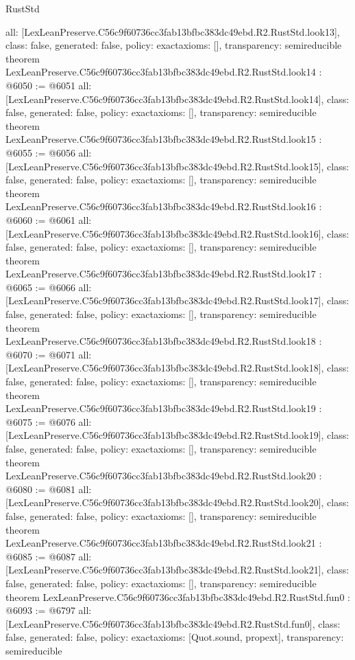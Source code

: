 \begin{lexlean}{RustStd}
\begin{coremodule}
{  all: [LexLeanPreserve.C56c9f60736cc3fab13bfbc383dc49ebd.R2.RustStd.look13],
  class: false,
  generated: false,
  policy: exact{axioms: []},
  transparency: semireducible
}
theorem LexLeanPreserve.C56c9f60736cc3fab13bfbc383dc49ebd.R2.RustStd.look14 : @6050 := @6051 {
  all: [LexLeanPreserve.C56c9f60736cc3fab13bfbc383dc49ebd.R2.RustStd.look14],
  class: false,
  generated: false,
  policy: exact{axioms: []},
  transparency: semireducible
}
theorem LexLeanPreserve.C56c9f60736cc3fab13bfbc383dc49ebd.R2.RustStd.look15 : @6055 := @6056 {
  all: [LexLeanPreserve.C56c9f60736cc3fab13bfbc383dc49ebd.R2.RustStd.look15],
  class: false,
  generated: false,
  policy: exact{axioms: []},
  transparency: semireducible
}
theorem LexLeanPreserve.C56c9f60736cc3fab13bfbc383dc49ebd.R2.RustStd.look16 : @6060 := @6061 {
  all: [LexLeanPreserve.C56c9f60736cc3fab13bfbc383dc49ebd.R2.RustStd.look16],
  class: false,
  generated: false,
  policy: exact{axioms: []},
  transparency: semireducible
}
theorem LexLeanPreserve.C56c9f60736cc3fab13bfbc383dc49ebd.R2.RustStd.look17 : @6065 := @6066 {
  all: [LexLeanPreserve.C56c9f60736cc3fab13bfbc383dc49ebd.R2.RustStd.look17],
  class: false,
  generated: false,
  policy: exact{axioms: []},
  transparency: semireducible
}
theorem LexLeanPreserve.C56c9f60736cc3fab13bfbc383dc49ebd.R2.RustStd.look18 : @6070 := @6071 {
  all: [LexLeanPreserve.C56c9f60736cc3fab13bfbc383dc49ebd.R2.RustStd.look18],
  class: false,
  generated: false,
  policy: exact{axioms: []},
  transparency: semireducible
}
theorem LexLeanPreserve.C56c9f60736cc3fab13bfbc383dc49ebd.R2.RustStd.look19 : @6075 := @6076 {
  all: [LexLeanPreserve.C56c9f60736cc3fab13bfbc383dc49ebd.R2.RustStd.look19],
  class: false,
  generated: false,
  policy: exact{axioms: []},
  transparency: semireducible
}
theorem LexLeanPreserve.C56c9f60736cc3fab13bfbc383dc49ebd.R2.RustStd.look20 : @6080 := @6081 {
  all: [LexLeanPreserve.C56c9f60736cc3fab13bfbc383dc49ebd.R2.RustStd.look20],
  class: false,
  generated: false,
  policy: exact{axioms: []},
  transparency: semireducible
}
theorem LexLeanPreserve.C56c9f60736cc3fab13bfbc383dc49ebd.R2.RustStd.look21 : @6085 := @6087 {
  all: [LexLeanPreserve.C56c9f60736cc3fab13bfbc383dc49ebd.R2.RustStd.look21],
  class: false,
  generated: false,
  policy: exact{axioms: []},
  transparency: semireducible
}
theorem LexLeanPreserve.C56c9f60736cc3fab13bfbc383dc49ebd.R2.RustStd.fun0 : @6093 := @6797 {
  all: [LexLeanPreserve.C56c9f60736cc3fab13bfbc383dc49ebd.R2.RustStd.fun0],
  class: false,
  generated: false,
  policy: exact{axioms: [Quot.sound, propext]},
  transparency: semireducible
}
\end{coremodule}
\end{lexlean}
